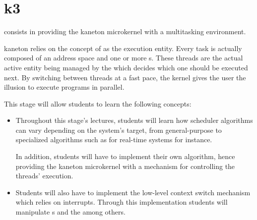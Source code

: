 %
%
%
%
%
%

%
%

\chapter{k3}
\label{chapter:k3}

 consists in providing the kaneton microkernel with a multitasking
environment.

kaneton relies on the concept of  as the execution entity. Every
task is actually composed of an address space and one or more s.
These threads are the actual active entity being managed by the
 which decides which one should be executed next. By switching
between threads at a fast pace, the kernel gives the user the illusion to
execute programs in parallel.

This stage will allow students to learn the following concepts:

\begin{itemize}
  \item

    \-

    Throughout this stage's lectures, students will learn how scheduler
    algorithms can vary depending on the system's target, from general-purpose
    to specialized algorithms such as for real-time systems for instance.

    \-

    In addition, students will have to implement their own algorithm, hence
    providing the kaneton microkernel with a mechanism for controlling the
    threads' execution.
  \item

    \-

    Students will also have to implement the low-level context switch
    mechanism which relies on interrupts. Through this implementation students
    will manipulate s and the  among others.
\end{itemize}

